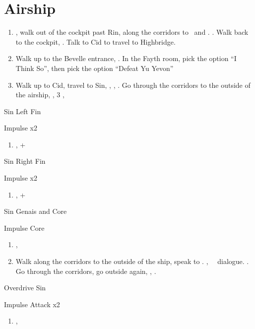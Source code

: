 \chapter{Airship}
\begin{enumerate}
    \item \sd, walk out of the cockpit past Rin, along the corridors to \yuna\ and \kimahri. \sd. Walk back to the cockpit, \sd. Talk to Cid to travel to Highbridge.
    \item Walk up to the Bevelle entrance, \sd. In the Fayth room, pick the  option ``I Think So'', then pick the  option ``Defeat Yu Yevon''
    \item Walk up to Cid, travel to Sin, \sd, \skippablefmv, \sd. Go through the corridors to the outside of the airship, \sd, 3 \skippablefmv[2:10], \sd
\end{enumerate}
\begin{battle}[65000]{Sin Left Fin}
    \begin{itemize}
        \summon{\bahamut}
        \bahamutf Impulse x2
    \end{itemize}
\end{battle}
\begin{enumerate}[resume]
    \item \sd, \cs+\skippablefmv
\end{enumerate}
\begin{battle}[65000]{Sin Right Fin}
    \begin{itemize}
        \summon{\bahamut}
        \bahamutf Impulse x2
    \end{itemize}
\end{battle}
\begin{enumerate}[resume]
    \item \sd, \cs+\skippablefmv
\end{enumerate}
\begin{battle}[56000]{Sin Genais and Core}
    \begin{itemize}
        \summon{\bahamut}
        \bahamutf Impulse Core
    \end{itemize}
\end{battle}
\begin{enumerate}[resume]
    \item \sd, \skippablefmv
    \item Walk along the corridors to the outside of the ship, speak to \yuna. \cs[1:40], \sd\ \rikku\ dialogue. \skippablefmv. Go through the corridors, go outside again, \skippablefmv, \sd.
\end{enumerate}
\begin{battle}[140000]{Overdrive Sin}
    \begin{itemize}
        \summon{\bahamut}
        \bahamutf Impulse
        \bahamutf Attack x2
    \end{itemize}
\end{battle}
\begin{enumerate}[resume]
    \item \skippablefmv[1:20], \sd
\end{enumerate}
